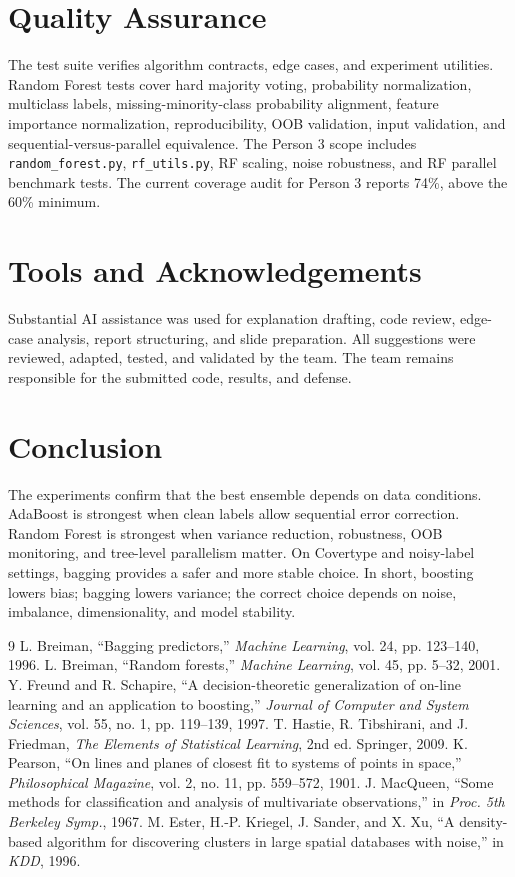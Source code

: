 \documentclass[11pt,twocolumn]{article}
\begin{document}
\section{Quality Assurance}
The test suite verifies algorithm contracts, edge cases, and experiment utilities. Random Forest tests cover hard majority voting, probability normalization, multiclass labels, missing-minority-class probability alignment, feature importance normalization, reproducibility, OOB validation, input validation, and sequential-versus-parallel equivalence. The Person 3 scope includes \texttt{random\_forest.py}, \texttt{rf\_utils.py}, RF scaling, noise robustness, and RF parallel benchmark tests. The current coverage audit for Person 3 reports 74\%, above the 60\% minimum.

\section{Tools and Acknowledgements}
Substantial AI assistance was used for explanation drafting, code review, edge-case analysis, report structuring, and slide preparation. All suggestions were reviewed, adapted, tested, and validated by the team. The team remains responsible for the submitted code, results, and defense.

\section{Conclusion}
The experiments confirm that the best ensemble depends on data conditions. AdaBoost is strongest when clean labels allow sequential error correction. Random Forest is strongest when variance reduction, robustness, OOB monitoring, and tree-level parallelism matter. On Covertype and noisy-label settings, bagging provides a safer and more stable choice. In short, boosting lowers bias; bagging lowers variance; the correct choice depends on noise, imbalance, dimensionality, and model stability.

\begin{thebibliography}{9}
 L. Breiman, ``Bagging predictors,'' \emph{Machine Learning}, vol. 24, pp. 123--140, 1996.
 L. Breiman, ``Random forests,'' \emph{Machine Learning}, vol. 45, pp. 5--32, 2001.
 Y. Freund and R. Schapire, ``A decision-theoretic generalization of on-line learning and an application to boosting,'' \emph{Journal of Computer and System Sciences}, vol. 55, no. 1, pp. 119--139, 1997.
 T. Hastie, R. Tibshirani, and J. Friedman, \emph{The Elements of Statistical Learning}, 2nd ed. Springer, 2009.
 K. Pearson, ``On lines and planes of closest fit to systems of points in space,'' \emph{Philosophical Magazine}, vol. 2, no. 11, pp. 559--572, 1901.
 J. MacQueen, ``Some methods for classification and analysis of multivariate observations,'' in \emph{Proc. 5th Berkeley Symp.}, 1967.
 M. Ester, H.-P. Kriegel, J. Sander, and X. Xu, ``A density-based algorithm for discovering clusters in large spatial databases with noise,'' in \emph{KDD}, 1996.
\end{thebibliography}
\end{document}
